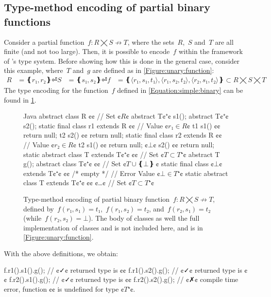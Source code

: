 \subsection{Type-method encoding of partial binary functions}
Consider a partial function~$f: R⨉S↛T$,
  where the sets~$R$,~$S$ and~$T$ are all finite (and not too large).
Then, it is possible to encode~$f$ within the framework of \Java's type system.
Before showing how this is done in the general case, consider this example,
where~$T$ and~$g$ are defined as in \cref{Figure:unary:function}:
\begin{equation}
  \label{Equation:simple:binary}
\begin{split}
  R & = ❴ r₁, r₂❵⏎
  S & = ❴ s₁, s₂❵⏎
  f & = ❴ ⟨r₁, s₁, t₁⟩, ⟨r₁, s₂, t₂⟩, ⟨r₂, s₁, t₂⟩ ❵ ⊂R⨉S⨉T
\end{split}
\end{equation}
The \Java type encoding for the function~$f$ defined in \cref{Equation:simple:binary}
  can be found in \cref{Figure:simple:binary}.

\begin{figure}[hbt]
  \begin{Code}{Java}
abstract class R {¢¢ // Set ¢$R$¢
  abstract T¢$⁺$¢ s1();
  abstract T¢$⁺$¢ s2();
  static final class r1 extends R {¢¢ // Value ¢$r₁∈R$¢
    t1 s1() {¢¢ return null; }
    t2 s2() {¢¢ return null; }
  }
  static final class r2 extends R {¢¢ // Value ¢$r₂∈R$¢
    t2 s1() {¢¢ return null; }
    ¢$⊥$¢ s2() {¢¢ return null; }
  }
  static abstract class T extends T¢$⁺$¢ {¢¢ // Set ¢$T⊂T⁺$¢
    abstract T g();
  }
  abstract class T¢$⁺$¢ {¢¢ // Set ¢$T∪❴⊥❵~$¢
    static final class ¢$⊥$¢ extends T¢$⁺$¢ {¢¢ /* empty */ } // Error Value ¢$⊥∈T⁺$¢
    static abstract class T extends T¢$⁺$¢ {¢¢ ¢…¢ } // Set ¢$T⊂T⁺$¢
  }
}
\end{Code}
  \caption{Type-method encoding of partial binary function~$f: R⨉S↛T$,
  defined by~$f(r₁,s₁)=t₁$,~$f(r₁,s₂)=t₂$, and~$f(r₂,s₁)=t₂$ (while~$f(r₂, s₂) =⊥$).
  The body of classes  as well the full implementation of classes  and  is not included here, and is
    in \cref{Figure:unary:function}.}
  \label{Figure:simple:binary}
\end{figure}

With the above definitions, we obtain:
\begin{JAVA}
f.r1().s1().g(); // ¢✓¢ returned type is ¢¢
f.r1().s2().g(); // ¢✓¢ returned type is ¢¢
f.r2().s1().g(); // ¢✓¢ returned type is ¢¢
f.r2().s2().g(); // ¢✗¢ compile time error, function ¢¢ is undefined for type ¢$T⁺$¢.
\end{JAVA}

